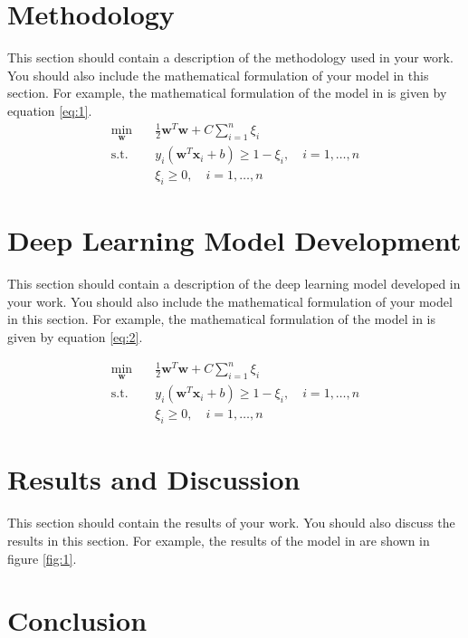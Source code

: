 \documentclass[lettersize, journal]{IEEEtran}
\begin{document}
\section{Methodology}
\label{sec:methodology}
This section should contain a description of the methodology used in your work. You should also include the mathematical formulation of your model in this section. For example, the mathematical formulation of the model in \cite{ajao2020} is given by equation \ref{eq:1}.
\begin{equation}
    \label{eq:1}
    \begin{split}
        \min_{\mathbf{w}} \quad & \frac{1}{2} \mathbf{w}^T \mathbf{w} + C \sum_{i=1}^{n} \xi_i \\
        \text{s.t.} \quad & y_i(\mathbf{w}^T \mathbf{x}_i + b) \geq 1 - \xi_i, \quad i = 1, \dots, n \\
        & \xi_i \geq 0, \quad i = 1, \dots, n
    \end{split}
\end{equation}

\section[short]{Deep Learning Model Development}
\label{sec:dl_model}
This section should contain a description of the deep learning model developed in your work. You should also include the mathematical formulation of your model in this section. For example, the mathematical formulation of the model in \cite{ajao2020} is given by equation \ref{eq:2}.

\begin{equation}
    \label{eq:2}
    \begin{split}
        \min_{\mathbf{w}} \quad & \frac{1}{2} \mathbf{w}^T \mathbf{w} + C \sum_{i=1}^{n} \xi_i \\
        \text{s.t.} \quad & y_i(\mathbf{w}^T \mathbf{x}_i + b) \geq 1 - \xi_i, \quad i = 1, \dots, n \\
        & \xi_i \geq 0, \quad i = 1, \dots, n
    \end{split}
\end{equation}

\section{Results and Discussion}
\label{sec:results}
This section should contain the results of your work. You should also discuss the results in this section. For example, the results of the model in \cite{ajao2020} are shown in figure \ref{fig:1}.

\section{Conclusion}
\label{sec:conclusion}



\printbibliography
\end{document}
